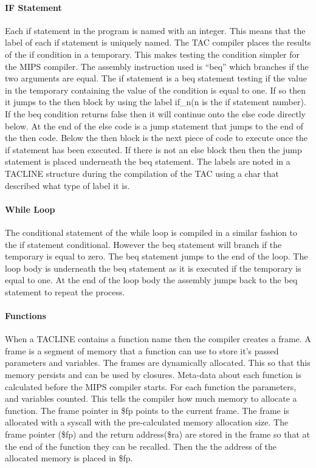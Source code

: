 \documentclass{article}
\begin{document}
	\paragraph{IF Statement}
	
	Each if statement in the program is named with an integer. This means that the label of each if statement is uniquely named. The TAC compiler places the results of the if condition in a temporary. This makes testing the condition simpler for the MIPS compiler. The assembly instruction used is “beq” which branches if the two arguments are equal. The if statement is a beq statement testing if the value in the temporary containing the value of the condition is equal to one. If so then it jumps to the then block by using the label if\_n(n is the if statement number). If the beq condition returns false then it will continue onto the else code directly below. At the end of the else code is a jump statement that jumps to the end of the then code. Below the then block is the next piece of code to execute once the if statement has been executed. If there is not an else block then then the jump statement is placed underneath the beq statement. The labels are noted in a TACLINE structure during the compilation of the TAC using a char that described what type of label it is.
	
	\paragraph{While Loop}
	
	The conditional statement of the while loop is compiled in a similar fashion to the if statement conditional. However the beq statement will branch if the temporary is equal to zero. The beq statement jumps to the end of the loop. The loop body is underneath the beq statement as it is executed if the temporary is equal to one. At the end of the loop body the assembly jumps back to the beq statement to repeat the process. 
	
	\paragraph{Functions}
	
	When a TACLINE contains a function name then the compiler creates a frame. A frame is a segment of memory that a function can use to store it's passed parameters and variables. The frames are dynamically allocated. This so that this memory persists and can be used by closures. Meta-data about each function is calculated before the MIPS compiler starts. For each function the parameters,  and variables counted. This tells the compiler how much memory to allocate a function. The frame pointer in \$fp points to the current frame. The frame is allocated with a syscall with the pre-calculated memory allocation size. The frame pointer (\$fp) and the return address(\$ra) are stored in the frame so that at the end of the function they can be recalled. Then the the address of the allocated memory is placed in \$fp.
	
\end{document}
